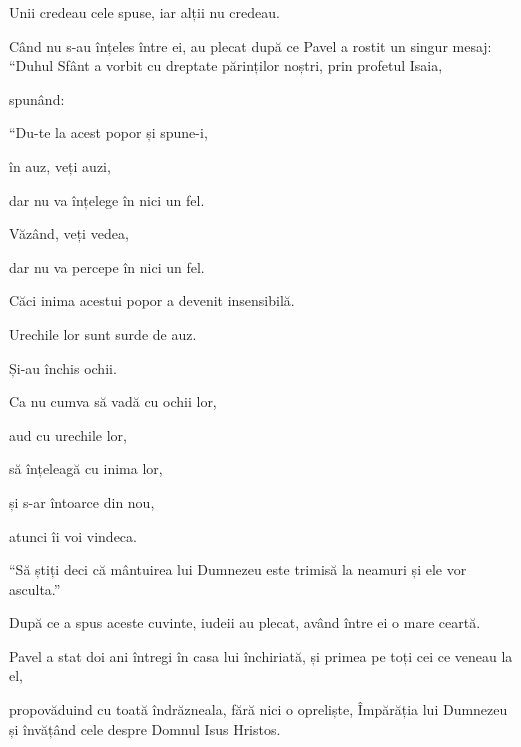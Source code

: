 {Unii credeau cele spuse, iar alții nu credeau.

Când nu s-au înțeles între ei, au plecat după ce Pavel a rostit un singur mesaj: “Duhul Sfânt a vorbit cu dreptate părinților noștri, prin profetul Isaia,

spunând:

\par }{\Q “Du-te la acest popor și spune-i,

\par }{\Q în auz, veți auzi,

\par }{\QB dar nu va înțelege în nici un fel.

\par }{\Q Văzând, veți vedea,

\par }{\QB dar nu va percepe în nici un fel.


\par }{\Q {}Căci inima acestui popor a devenit insensibilă.

\par }{\QB Urechile lor sunt surde de auz.

\par }{\QB Și-au închis ochii.

\par }{\Q Ca nu cumva să vadă cu ochii lor,

\par }{\QB aud cu urechile lor,

\par }{\QB să înțeleagă cu inima lor,

\par }{\QB și s-ar întoarce din nou,

\par }{\QB atunci îi voi vindeca.


\par }{\PP {}“Să știți deci că mântuirea lui Dumnezeu este trimisă la neamuri și ele vor asculta.”


\par }{\PP {}După ce a spus aceste cuvinte, iudeii au plecat, având între ei o mare ceartă.


\par }{\PP {}Pavel a stat doi ani întregi în casa lui închiriată, și primea pe toți cei ce veneau la el,

propovăduind cu toată îndrăzneala, fără nici o opreliște, Împărăția lui Dumnezeu și învățând cele despre Domnul Isus Hristos.


\par }